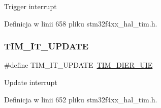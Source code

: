 Trigger interrupt 

Definicja w linii 658 pliku stm32f4xx\+\_\+hal\+\_\+tim.\+h.

\mbox{\label{group___t_i_m___interrupt__definition_ga6a48ecf88cae0402ff084202bfdd4f8e}} 
\subsubsection{\texorpdfstring{T\+I\+M\+\_\+\+I\+T\+\_\+\+U\+P\+D\+A\+TE}{TIM\_IT\_UPDATE}}
{\footnotesize\ttfamily \#define T\+I\+M\+\_\+\+I\+T\+\_\+\+U\+P\+D\+A\+TE~\hyperlink{group___peripheral___registers___bits___definition_ga5c6d3e0495e6c06da4bdd0ad8995a32b}{T\+I\+M\+\_\+\+D\+I\+E\+R\+\_\+\+U\+IE}}

Update interrupt 

Definicja w linii 652 pliku stm32f4xx\+\_\+hal\+\_\+tim.\+h.

